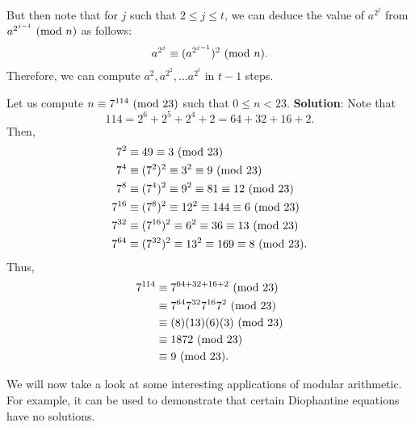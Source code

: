 But then note that for $ j $ such that $ 2\le j\le t $, we can deduce the value of $ a^{2^j} $
from $ a^{2^{j-1}}\ (\mathrm{mod}\ n) $ as follows:
\[ a^{2^j}\equiv (a^{2^{j-1}})^2\ (\mathrm{mod}\ n). \]
Therefore, we can compute $ a^2,a^{2^2},\ldots a^{2^t} $ in $ t-1 $ steps.
\begin{Example}{}{}
    Let us compute $ n\equiv 7^{114}\ (\mathrm{mod}\ 23) $ such that $ 0\le n<23 $.
    \tcblower{}
    \textbf{Solution}: Note that
    \[ 114=2^6+2^5+2^4+2=64+32+16+2. \]
    Then,
    \begin{align*}
        7^2    & \equiv 49\equiv 3\ (\mathrm{mod}\ 23)                               \\
        7^4    & \equiv (7^2)^2\equiv 3^2\equiv 9\ (\mathrm{mod}\ 23)                \\
        7^8    & \equiv (7^4)^2\equiv 9^2\equiv 81\equiv 12\ (\mathrm{mod}\ 23)      \\
        7^{16} & \equiv (7^8)^2\equiv 12^2\equiv 144\equiv 6\ (\mathrm{mod}\ 23)     \\
        7^{32} & \equiv (7^{16})^2\equiv 6^2\equiv 36\equiv 13\ (\mathrm{mod}\ 23)   \\
        7^{64} & \equiv (7^{32})^2\equiv 13^2\equiv 169\equiv 8\ (\mathrm{mod}\ 23).
    \end{align*}
    Thus,
    \begin{align*}
        7^{114} & \equiv 7^{64+32+16+2}\ (\mathrm{mod}\ 23)        \\
                & \equiv 7^{64}7^{32}7^{16}7^2\ (\mathrm{mod}\ 23) \\
                & \equiv (8)(13)(6)(3)\ (\mathrm{mod}\ 23)         \\
                & \equiv 1872\ (\mathrm{mod}\ 23)                  \\
                & \equiv 9\ (\mathrm{mod}\ 23).
    \end{align*}
\end{Example}
We will now take a look at some interesting applications of modular arithmetic.
For example, it can be used to demonstrate that certain Diophantine equations have
no solutions.
